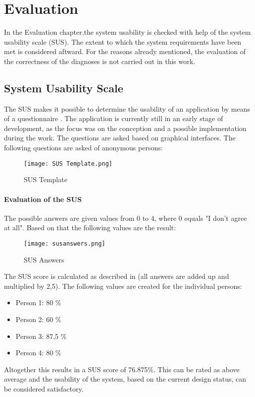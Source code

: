 
\chapter{Evaluation}
In the Evaluation chapter,the system usability is checked with help of the system usability scale (SUS). The extent to which the system requirements have been met is considered aftward. For the reasons already mentioned, the evaluation of the correctness of the diagnoses is not carried out in this work.

\section{System Usability Scale}
The SUS makes it possible to determine the usability of an application by means of a questionnaire \cite{.sus}. The application is currently still in an early stage of development, as the focus was on the conception and a possible implementation during the work. The questions are asked based on graphical interfaces. The following questions  \cite{.sus} are asked of anonymous persons:
\begin{figure}[H]
	\centering
	\texttt{[image: SUS Template.png]}
	\caption{SUS Template}
\end{figure}
\subsubsection{Evaluation of the SUS}
The possible answers are given values from 0 to 4, where 0 equals "I don't agree at all". Based on that the following values are the result:
\begin{figure}[H]
	\centering
	\texttt{[image: susanswers.png]}
	\caption{SUS Answers}
\end{figure}
\noindent
The SUS score is calculated as described in \cite{.sus} (all answers are added up and multiplied by 2,5). The following values are created for the individual persons:
\begin{itemize}
	\item Person 1: 80 \%
	\item Person 2: 60 \%
	\item Person 3: 87,5 \%
	\item Person 4: 80 \%
\end{itemize}
Altogether this results in a SUS score of 76.875\%. This can be rated as above average \cite{.sus} and the usability of the system, based on the current design status, can be considered satisfactory.
